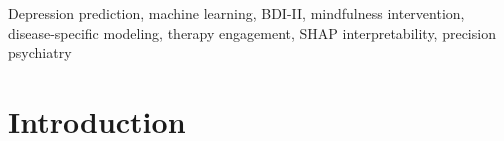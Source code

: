 \documentclass[conference]{IEEEtran}
\begin{document}
\begin{IEEEkeywords}
Depression prediction, machine learning, BDI-II, mindfulness intervention, disease-specific modeling, therapy engagement, SHAP interpretability, precision psychiatry
\end{IEEEkeywords}

\section{Introduction}



\end{document}
